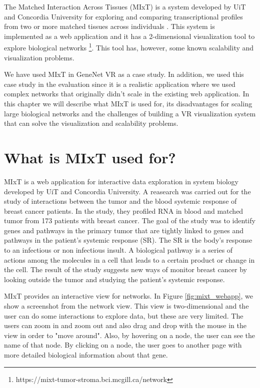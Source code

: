 
The Matched Interaction Across Tissues (MIxT) is a system developed by UiT and Concordia University for exploring and comparing transcriptional profiles from two or more matched tissues across individuals \cite{fjukstad_dumeaux_olsen_lund_hallett_bongo_2017}. This system is implemented as a web application and it has a 2-dimensional visualization tool to explore biological networks \footnote{https://mixt-tumor-stroma.bci.mcgill.ca/network}. This tool has, however, some known scalability and visualization problems.

We have used MIxT in GeneNet VR as a case study. In addition, we used this case study in the evaluation since it is a realistic application where we used complex networks that originally didn't scale in the existing web application. In this chapter we will describe what MIxT is used for, its disadvantages for scaling large biological networks and the challenges of building a VR visualization system that can solve the visualization and scalability problems.

\section{What is MIxT used for?}
MIxT is a web application for interactive data exploration in system biology developed by UiT and Concordia University. A reasearch was carried out for the study of interactions between the tumor and the blood systemic response of breast cancer patients. In the study, they profiled RNA in blood and matched tumor from 173 patients with breast cancer. The goal of the study was to identify genes and pathways in the primary tumor that are tightly linked to genes and pathways in the patient's systemic response (SR). The SR is the body's response to an infectious or non infectious insult. A biological pathway is a series of actions among the molecules in a cell that leads to a certain product or change in the cell. The result of the study suggests new ways of monitor breast cancer by looking outside the tumor and studying the patient's systemic response.

MIxT provides an interactive view for networks. In Figure \ref{fig:mixt_webapp}, we show a screenshot from the network view. This view is two-dimensional and the user can do some interactions to explore data, but these are very limited. The users can zoom in and zoom out and also drag and drop with the mouse in the view in order to "move around". Also, by hovering on a node, the user can see the name of that node. By clicking on a node, the user goes to another page with more detailed biological information about that gene.

